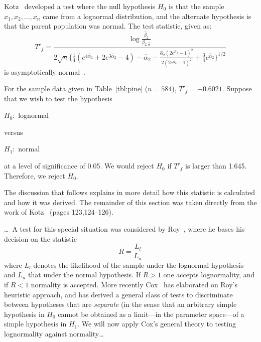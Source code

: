 \documentclass[draft]{article}
\newenvironment{example}{%
   \vspace{\baselineskip}
   \par\noindent\hrulefill\par
   \noindent{\em Example:}}{%
   \par\noindent\hrulefill\par
   \vspace{\baselineskip}}
\begin{document}
Kotz~\cite{kotz73} developed a test where the null hypothesis
\(H_0\) is that the sample \(x_1, x_2, \ldots, x_n\) came
from a lognormal distribution, and the alternate hypothesis
is that the parent population was normal. The test statistic,
given as:
\begin{equation}
T'_f = \frac{\log\frac{\hat{\beta}_2}{\beta_{2,\hat{\alpha}}}}
{2\sqrt{n}\{\frac{1}{4}\left(e^{4\hat{\alpha}_2}+
2e^{3\hat{\alpha}_2} -4\right) -\hat{\alpha}_2 -
\frac{\hat{\alpha}_2\left(2e^{\hat{\alpha}_2}-1\right)^2}
     {2\left(2e^{\hat{\alpha}_2}-1\right)^2}
+\frac{3}{4}e^{\hat{\alpha}_2}\}^{1/2}}
\end{equation}
is asymptotically normal~\cite{cox62}.

\begin{example}
For the sample data given in Table~\ref{tbl:pine} (\(n=584\)), 
\(T'_f = -0.6021\).  Suppose that we wish to test the hypothesis

\(H_0:\) lognormal

\noindent versus

\(H_1:\) normal

\noindent at a level of significance of 0.05. We would
reject \(H_0\) if \(T'_f\) is larger
than 1.645.  Therefore, we reject \(H_0\).
\end{example}

The discussion that follows explains in more detail how this 
statistic is calculated and how it was derived. The remainder
of this section
was taken directly from the work of Kotz~\cite{kotz73}
(pages 123,124--126).

\ldots\ A test for this special situation was considered 
by Roy~\cite{roy50}, where he bases his decision on the
statistic
\begin{equation}
R=\frac{L_l}{L_n}
\end{equation}
where \(L_l\) denotes the likelihood of the sample under the
lognormal hypothesis and \(L_n\) that under the normal
hypothesis. If \(R>1\) one accepts lognormality,
and if \(R<1\) normality is accepted. More recently Cox~\cite{cox61,cox62}
has elaborated on Roy's heuristic approach, and has derived a general
class of tests to discriminate between hypotheses that are {\em separate\/}
(in the sense that an arbitrary simple hypothesis in \(H_0\) cannot
be obtained as a limit---in the parameter space---of a simple hypothesis
in \(H_1\). We will now apply Cox's general theory to testing
lognormality against normality\ldots
\end{document}
